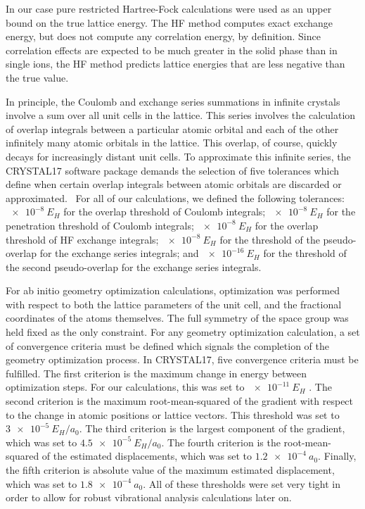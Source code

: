 \documentclass[titlepage,11pt]{article}
\begin{document}
In our case pure restricted Hartree-Fock calculations were used as an upper bound on the true lattice energy. The HF method computes exact exchange energy, but does not compute any correlation energy, by definition. Since correlation effects are expected to be much greater in the solid phase than in single ions, the HF method predicts lattice energies that are less negative than the true value.


In principle, the Coulomb and exchange series summations in infinite crystals involve a sum over all unit cells in the lattice. This series involves the calculation of overlap integrals between a particular atomic orbital and each of the other infinitely many atomic orbitals in the lattice. This overlap, of course, quickly decays for increasingly distant unit cells. To approximate this infinite series, the CRYSTAL17 software package demands the selection of five tolerances which define when certain overlap integrals between atomic orbitals are discarded or approximated.~\cite{Crystal17Manual} For all of our calculations, we defined the following tolerances: $\SI{e-8}{E_{H}}$ for the overlap threshold of Coulomb integrals; $\SI{e-8}{E_{H}}$ for the penetration threshold of Coulomb integrals; $\SI{e-8}{E_{H}}$ for the overlap threshold of HF exchange integrals; $\SI{e-8}{E_{H}}$ for the threshold of the pseudo-overlap for the exchange series integrals; and $\SI{e-16}{E_{H}}$ for the threshold of the second pseudo-overlap for the exchange series integrals.

For ab initio geometry optimization calculations, optimization was performed with respect to both the lattice parameters of the unit cell, and the fractional coordinates of the atoms themselves. The full symmetry of the space group was held fixed as the only constraint. For any geometry optimization calculation, a set of convergence criteria must be defined which signals the completion of the geometry optimization process. In CRYSTAL17, five convergence criteria must be fulfilled. The first criterion is the maximum change in energy between optimization steps. For our calculations, this was set to $\SI{e-11}{E_{H}}$ . The second criterion is the maximum root-mean-squared of the gradient with respect to the change in atomic positions or lattice vectors. This threshold was set to $\SI{3e-5}{E_{H} \per a_{0}}$. The third criterion is the largest component of the gradient, which was set to $\SI{4.5e-5}{E_{H} \per a_{0}}$. The fourth criterion is the root-mean-squared of the estimated displacements, which was set to $\SI{1.2e-4}{a_{0}}$. Finally, the fifth criterion is absolute value of the maximum estimated displacement, which was set to $\SI{1.8e-4}{a_{0}}$. All of these thresholds were set very tight in order to allow for robust vibrational analysis calculations later on.
\end{document}
